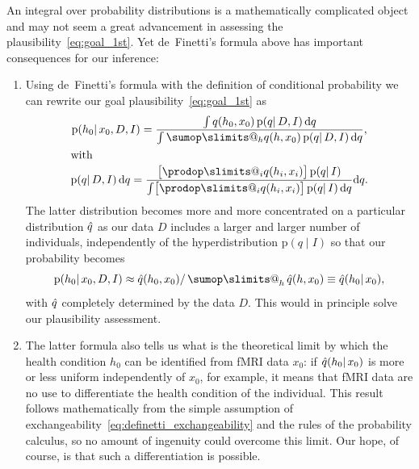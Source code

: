 \documentclass[\ifafour a4paper,12pt,\else a5paper,10pt,\fi%
onecolumn,oneside,article,%
british%
]{memoir}
\makeatletter
\theoremstyle{remark}
\theoremstyle{innote}
\def\sum{\DOTSI\sumop\slimits@}
\def\prod{\DOTSI\prodop\slimits@}
\newcommand*{\di}{\mathrm{d}}%
\newcommand*{\pf}{\mathrm{p}}%
\renewcommand*{\|}{\mathpunct{|}}
\newcommand*{\tsum}{\mathop{\textstyle\sum}\nolimits}
\newcommand*{\yH}{h}
\newcommand*{\yD}{D}
\newcommand*{\yx}{x}
\newcommand*{\yp}{q}
\newcommand*{\ypc}{\Hat{\yp}}
\newcommand*{\yI}{I}
\theoremstyle{plain}
\makeatother
\begin{document}
An integral over probability distributions is a mathematically complicated
object and may not seem a great advancement in assessing the
plausibility~\eqref{eq:goal_1st}. Yet de~Finetti's formula above has
important consequences for our inference:
\begin{enumerate}[wide]
\item Using de~Finetti's formula with the definition of conditional
  probability we can rewrite our goal plausibility~\eqref{eq:goal_1st} as
\begin{subequations}\label{eq:goal_1st_exchangeability}
  \begin{gather}
    \pf(\yH_0 \| \yx_0, \yD, \yI) = \frac{ \int \yp(\yH_0,\yx_0)\, \pf(\yp
      \|\yD,\yI) \,\di\yp }{ \int \sum_{\yH}\yp(\yH,\yx_0)\, \pf(\yp
      \|\yD,\yI) \,\di\yp }, \\\shortintertext{with} \pf(\yp \|\yD,\yI)
    \,\di\yp = \frac{ \bigl[ \prod_i \yp(\yH_i,\yx_i) \bigr]\, \pf(\yp
      \|\yI) }{ \int \bigl[ \prod_i \yp(\yH_i,\yx_i) \bigr]\, \pf(\yp
      \|\yI) \,\di\yp }\di\yp.
  \end{gather}
\end{subequations}
The latter distribution becomes more and more concentrated on a particular
distribution $\ypc$ as our data $\yD$ includes a larger and larger number
of individuals, independently of the hyperdistribution $\pf(\yp \|\yI)$ so
that our probability becomes
\begin{equation}
  \label{eq:goal_1st_limit}
  \pf(\yH_0 \| \yx_0, \yD, \yI) \approx
  \ypc(\yH_0,\yx_0) / \tsum_{\yH}\ypc(\yH,\yx_0)
  \equiv \ypc(\yH_0\|\yx_0),
\end{equation}
with $\ypc$ completely determined by the data $\yD$. This would in
principle solve our plausibility assessment.
\item The latter formula also tells us what is the theoretical limit by
  which the health condition $\yH_0$ can be identified from fMRI data
  $\yx_0$: if $\ypc(\yH_0\|\yx_0)$ is more or less uniform independently of
  $\yx_0$, for example, it means that fMRI data are no use to differentiate
  the health condition of the individual. This result follows
  mathematically from the simple assumption of
  exchangeability~\eqref{eq:definetti_exchangeability} and the rules of the
  probability calculus, so no amount of ingenuity could overcome this
  limit. Our hope, of course, is that such a differentiation is possible.
\end{enumerate}
\end{document}
